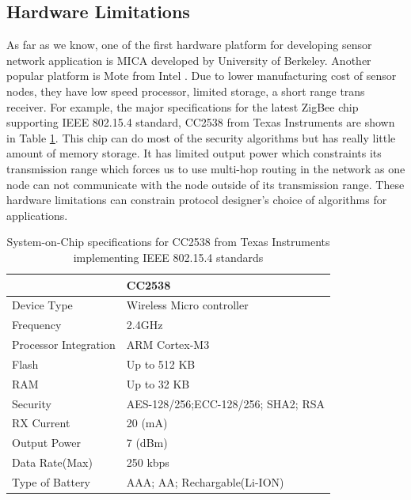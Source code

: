 	\subsection{Hardware Limitations}
		As far as we know, one of the first hardware platform for developing sensor network application is MICA \cite{hill2002mica} developed by University of Berkeley.
		Another popular platform is Mote from Intel \cite{arazi2006self}.
		Due to lower manufacturing cost of sensor nodes, they have low speed processor, limited storage, a short range trans receiver.
		For example, the major specifications for the latest ZigBee chip supporting IEEE 802.15.4 standard, CC2538 from Texas Instruments are shown in Table \ref{table:soc}.
		This chip can do most of the security algorithms but has really little amount of memory storage. It has limited output power which constraints its transmission range which forces us to use multi-hop routing in the network as one node can not communicate with the node outside of its transmission range.
		These hardware limitations can constrain protocol designer's choice of algorithms for applications.  
		\begin{table}[!htb]	
			\begin{center}
				\begin{tabular}{ |l| l| }
					\hline
				     & CC2538 \\
				    \hline
				    Device Type & Wireless Micro controller \\
				    Frequency & 2.4GHz \\
				    Processor Integration & ARM Cortex-M3 \\
						Flash & Up to 512 KB \\
						RAM & Up to 32 KB \\
						Security & AES-128/256;ECC-128/256; SHA2; RSA \\
						RX Current & 20 (mA) \\
						Output Power & 7 (dBm) \\
						Data Rate(Max) & 250 kbps \\
						Type of Battery & AAA; AA; Rechargable(Li-ION) \\
				    \hline
				\end{tabular}
			\end{center}
			 \caption{System-on-Chip specifications for CC2538 from Texas Instruments implementing IEEE 802.15.4 standards}
			 \label{table:soc}
		\end{table}
	
